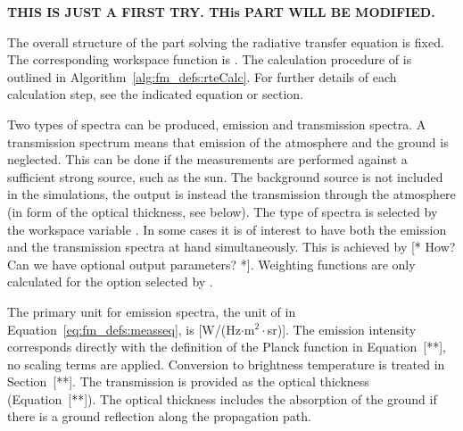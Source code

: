 {\bf THIS IS JUST A FIRST TRY. THis PART WILL BE MODIFIED.}


%
%
%
%
%
%
%


\label{sec:fm_defs:calcproc}

The overall structure of the part solving the radiative transfer
equation is fixed. The corresponding workspace function is
. The calculation procedure of  is
outlined in Algorithm~\ref{alg:fm_defs:rteCalc}. For further details
of each calculation step, see the indicated equation or section.

Two types of spectra can be produced, emission and transmission
spectra. A transmission spectrum means that emission of the atmosphere
and the ground is neglected. This can be done if the measurements are
performed against a sufficient strong source, such as the sun. The
background source is not included in the simulations, the output is
instead the transmission through the atmosphere (in form of the
optical thickness, see below). The type of spectra is selected by the
workspace variable . In some cases it is of interest
to have both the emission and the transmission spectra at hand
simultaneously. This is achieved by [* How? Can we have optional
output parameters? *]. Weighting functions are only calculated for the
option selected by .

The primary unit for emission spectra, the unit of  in
Equation~\ref{eq:fm_defs:measseq}, is [W/(Hz$\cdot$m$^2\cdot$sr)].
The emission intensity corresponds directly with the definition of the
Planck function in Equation~[**], no scaling terms are applied.
Conversion to brightness temperature is treated in Section~[**].  The
transmission is provided as the optical thickness (Equation~[**]).
The optical thickness includes the absorption of the ground if there
is a ground reflection along the propagation path.


